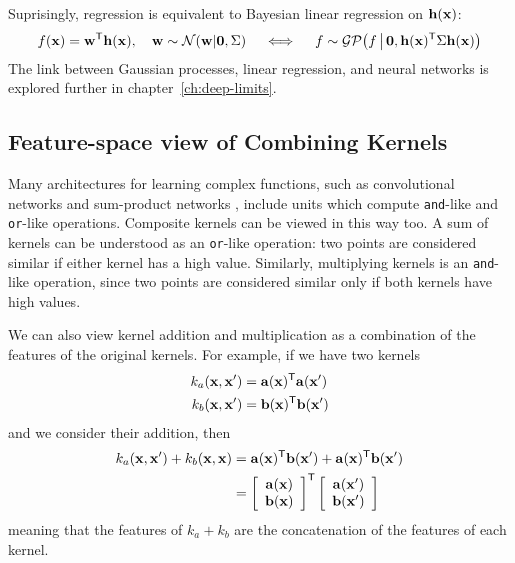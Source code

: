 Suprisingly, \gp{} regression is equivalent to Bayesian linear regression on ${\bf{h}}({\bf{x}})$:
%
\begin{align}
f({\bf{x}}) = {\bf{w}}^{\mathsf{T}} {\bf{h}}({\bf{x}}), \quad {\bf{w}} \sim \mathcal{N}\!\left({\bf{w}} \middle| {\bf{0}},\Sigma\right) \quad
\iff
\quad f \sim \mathcal{GP}\!\left(f \, \middle| \, {\bf{0}}, {\bf{h}}({\bf{x}}) ^{\mathsf{T}} \Sigma {\bf{h}}({\bf{x}}) \right)
\end{align}
%
The link between Gaussian processes, linear regression, and neural networks is explored further in chapter~\ref{ch:deep-limits}.


\subsection{Feature-space view of Combining Kernels}

\def\feata{\va}
\def\featb{\vb}

Many architectures for learning complex functions, such as convolutional networks \cite{lecun1989backpropagation} and sum-product networks \cite{poon2011sum}, include units which compute \texttt{and}-like and \texttt{or}-like operations.
Composite kernels can be viewed in this way too.
A sum of kernels can be understood as an \texttt{or}-like operation: two points are considered similar if either kernel has a high value.
Similarly, multiplying kernels is an \texttt{and}-like operation, since two points are considered similar only if both kernels have high values.


We can also view kernel addition and multiplication as a combination of the features of the original kernels.
For example, if we have two kernels
%
\begin{align}
k_a(\iva, \iva') & = \feata(\iva)\tra \feata(\iva')\\
k_b(\iva, \iva') & = \featb(\iva)\tra \featb(\iva')
\end{align}
%
and we consider their addition, then
%
\begin{align}
k_a(\iva, \iva') + k_b(\iva, \iva)
& = \feata(\iva)\tra \featb(\iva') + \feata(\iva)\tra \featb(\iva') \\
& = \colvec{\feata(\iva)}{\featb(\iva)}\tra \colvec{\feata(\iva')}{\featb(\iva')}
\end{align}
%
meaning that the features of $k_a + k_b$ are the concatenation of the features of each kernel.

